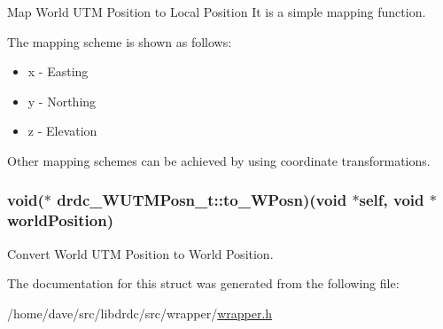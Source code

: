 Map World UTM Position to Local Position It is a simple mapping function. 

The mapping scheme is shown as follows:\begin{itemize}
\item x - Easting\item y - Northing\item z - Elevation\end{itemize}


Other mapping schemes can be achieved by using coordinate transformations. \hypertarget{structdrdc__WUTMPosn__t_3931b582e201f37b69d65fa238ca8aff}{
\subsubsection[to\_\-WPosn]{\setlength{\rightskip}{0pt plus 5cm}void($\ast$ {\bf drdc\_\-WUTMPosn\_\-t::to\_\-WPosn})(void $\ast$self, void $\ast$worldPosition)}}
\label{structdrdc__WUTMPosn__t_3931b582e201f37b69d65fa238ca8aff}


Convert World UTM Position to World Position. 



The documentation for this struct was generated from the following file:\begin{CompactItemize}
\item 
/home/dave/src/libdrdc/src/wrapper/\hyperlink{wrapper_8h}{wrapper.h}\end{CompactItemize}
